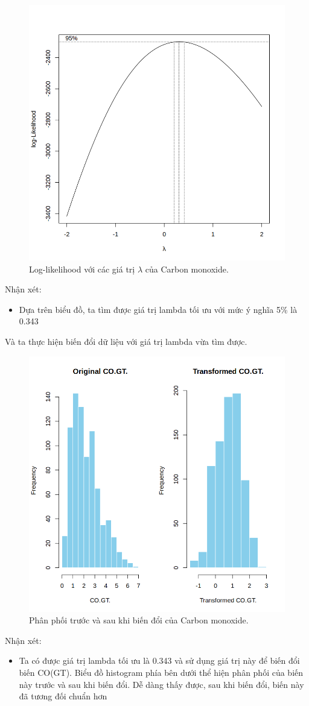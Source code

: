 \begin{figure}[H]
    \centering
    \includegraphics[width=0.75\columnwidth]{air_figures/CO(GT)_optimal_lambda.png}
    \caption{Log-likelihood với các giá trị $\lambda$ của Carbon monoxide.}
    \label{fig:co_optimal_lambda}
\end{figure}
Nhận xét:
\begin{itemize}
    \item Dựa trên biểu đồ, ta tìm được giá trị lambda tối ưu với mức ý nghĩa 5\% là 0.343
\end{itemize}

Và ta thực hiện biến đổi dữ liệu với giá trị lambda vừa tìm được.
\begin{figure}[H]
    \centering
    \includegraphics[width=0.75\columnwidth]{air_figures/CO(GT)_transformed_distribution.png}
    \caption{Phân phối trước và sau khi biến đổi của Carbon monoxide.}
    \label{fig:co_transformed_distribution}
\end{figure}
Nhận xét:
\begin{itemize}
    \item Ta có được giá trị lambda tối ưu là 0.343 và sử dụng giá trị này để biến đổi biến CO(GT). Biểu đồ histogram phía bên dưới thể hiện phân phối của biến này trước và sau khi biến đổi. Dễ dàng thấy được, sau khi biến đổi, biến này đã tương đối chuẩn hơn
\end{itemize}

